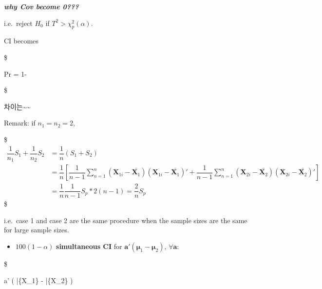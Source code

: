 \documentclass[
]{book}
\providecommand{\tightlist}{%
  \setlength{\itemsep}{0pt}\setlength{\parskip}{0pt}}
\begin{document}
{{{\textbf{\emph{why Cov become 0???}}

i.e.~reject \(H_0\) if \(T^2 > \chi_p^2 (\alpha)\).

CI becomes

\$

Pr  = 1-\alpha

\$

차이는\textasciitilde\textasciitilde{}

Remark: if \(n_1 = n_2 = 2\),

\$
\begin{align*}

\dfrac{1}{n_1} S_1 + \dfrac{1}{n_2} S_2 

&=  \dfrac{1}{n} (S_1 + S_2) \\

&= \dfrac{1}{n}

\left[

\dfrac{1}{n-1} \sum_{n=1}^n (\pmb X_{1i} - \bar {\pmb X_1})(\pmb X_{1i} - \bar {\pmb X_1})' + 
\dfrac{1}{n-1} \sum_{n=1}^n (\pmb X_{2i} - \bar {\pmb X_2})(\pmb X_{2i} - \bar {\pmb X_2})'

\right] \\

&= \dfrac{1}{n} \dfrac{1}{n-1} S_p \ast 2(n-1) 

= \dfrac{2}{n}  S_p 


\end{align*}
\$

i.e.~case 1 and case 2 are the same procedure when the sample sizes are the same for large sample sizes.

\begin{itemize}
\tightlist
\item
  \(100(1-\alpha)%
  \) \textbf{simultaneous CI} for \(\pmb a'(\pmb \mu_1 - \pmb \mu_2)\), \(\forall \pmb a\):
\end{itemize}

\$

\pmb a' \left( \bar \{\pmb X\_1\} - \bar \{\pmb X\_2\} \right) \pm {} 

}}}
\end{document}
